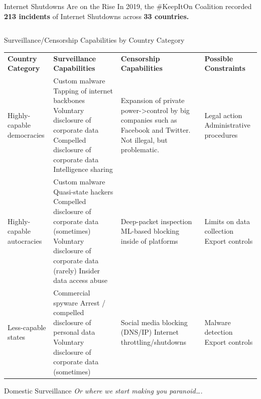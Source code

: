 \documentclass[nobackground,dvipsnames,table]{beamer}
\begin{document}
\begin{frame}{Internet Shutdowns Are on the Rise}
    In 2019, the \#KeepItOn Coalition recorded \textbf{213 incidents} of Internet Shutdowns across \textbf{33 countries.} 
    \begin{columns}
    \end{columns}
\end{frame}

\begin{frame}{Surveillance/Censorship Capabilities by Country Category}
    \footnotesize %
    \begin{tabularx}{\textwidth}{|X|X|X|X|}
        \hline
        \textbf{Country Category} & \textbf{Surveillance Capabilities} & \textbf{Censorship Capabilities} & \textbf{Possible Constraints}\\
        Highly-capable democracies & Custom malware Tapping of internet backbones Voluntary disclosure of corporate data Compelled disclosure of corporate data Intelligence sharing & Expansion of private power->control by big companies such as Facebook and Twitter. Not illegal, but problematic. & Legal action Administrative procedures\\
        \hline
        \hline
        Highly-capable autocracies & Custom malware Quasi-state hackers Compelled disclosure of corporate data (sometimes) Voluntary disclosure of corporate data (rarely) Insider data access abuse & Deep-packet inspection ML-based blocking inside of platforms & Limits on data collection Export controls\\
        \hline
        Less-capable states & Commercial spyware Arrest / compelled disclosure of personal data Voluntary disclosure of corporate data (sometimes) & Social media blocking (DNS/IP) Internet throttling/shutdowns & Malware detection Export controls\\
        \hline
    \end{tabularx}
\end{frame}

\begin{frame}{Domestic Surveillance}
    \textit{Or where we start making you paranoid….}
\end{frame}
\end{document}
